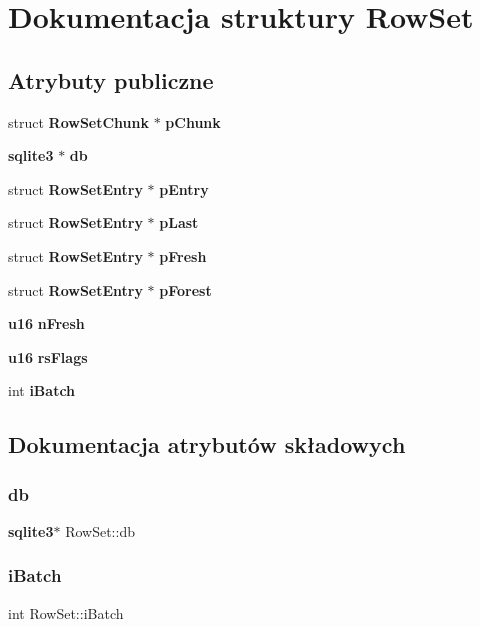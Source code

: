 \section{Dokumentacja struktury Row\+Set}
\label{struct_row_set}
\subsection*{Atrybuty publiczne}
\begin{DoxyCompactItemize}
\item 
struct \textbf{ Row\+Set\+Chunk} $\ast$ \textbf{ p\+Chunk}
\item 
\textbf{ sqlite3} $\ast$ \textbf{ db}
\item 
struct \textbf{ Row\+Set\+Entry} $\ast$ \textbf{ p\+Entry}
\item 
struct \textbf{ Row\+Set\+Entry} $\ast$ \textbf{ p\+Last}
\item 
struct \textbf{ Row\+Set\+Entry} $\ast$ \textbf{ p\+Fresh}
\item 
struct \textbf{ Row\+Set\+Entry} $\ast$ \textbf{ p\+Forest}
\item 
\textbf{ u16} \textbf{ n\+Fresh}
\item 
\textbf{ u16} \textbf{ rs\+Flags}
\item 
int \textbf{ i\+Batch}
\end{DoxyCompactItemize}


\subsection{Dokumentacja atrybutów składowych}
\mbox{\label{struct_row_set_a7da847a06c2f90025fbd89c57516c6f6}} 
\subsubsection{db}
{\footnotesize\ttfamily \textbf{ sqlite3}$\ast$ Row\+Set\+::db}

\mbox{\label{struct_row_set_a90ebc79619b880c1a38b96622ad0ffe0}} 
\subsubsection{iBatch}
{\footnotesize\ttfamily int Row\+Set\+::i\+Batch}

\mbox{\label{struct_row_set_a0ed2a47d6789a70081f3454ef2604e7f}} 
